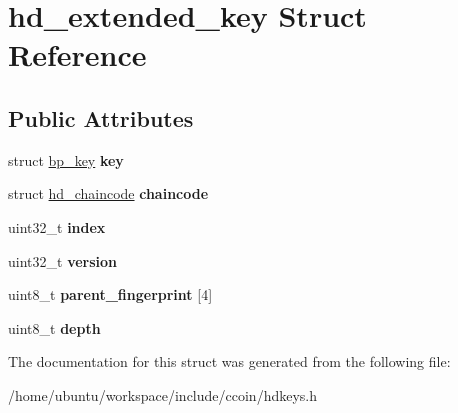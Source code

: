 \hypertarget{structhd__extended__key}{\section{hd\-\_\-extended\-\_\-key Struct Reference}
\label{structhd__extended__key}
}
\subsection*{Public Attributes}
\begin{DoxyCompactItemize}
\item 
\hypertarget{structhd__extended__key_a32e2a6e132a0af22cef89eca32424df1}{struct \hyperlink{structbp__key}{bp\-\_\-key} {\bfseries key}}\label{structhd__extended__key_a32e2a6e132a0af22cef89eca32424df1}

\item 
\hypertarget{structhd__extended__key_a859dec4ed38e20a43f828fbf1b79094e}{struct \hyperlink{structhd__chaincode}{hd\-\_\-chaincode} {\bfseries chaincode}}\label{structhd__extended__key_a859dec4ed38e20a43f828fbf1b79094e}

\item 
\hypertarget{structhd__extended__key_adfae22312bd519bd21f40aa1a2a9076b}{uint32\-\_\-t {\bfseries index}}\label{structhd__extended__key_adfae22312bd519bd21f40aa1a2a9076b}

\item 
\hypertarget{structhd__extended__key_a69c00a2d280a9cf3ea59d2b9799a7b6b}{uint32\-\_\-t {\bfseries version}}\label{structhd__extended__key_a69c00a2d280a9cf3ea59d2b9799a7b6b}

\item 
\hypertarget{structhd__extended__key_af703b27ec61d6b4285743279b09366af}{uint8\-\_\-t {\bfseries parent\-\_\-fingerprint} \mbox{[}4\mbox{]}}\label{structhd__extended__key_af703b27ec61d6b4285743279b09366af}

\item 
\hypertarget{structhd__extended__key_a77af7cd1b518b4717cb0ef60bff0471e}{uint8\-\_\-t {\bfseries depth}}\label{structhd__extended__key_a77af7cd1b518b4717cb0ef60bff0471e}

\end{DoxyCompactItemize}


The documentation for this struct was generated from the following file\-:\begin{DoxyCompactItemize}
\item 
/home/ubuntu/workspace/include/ccoin/hdkeys.\-h\end{DoxyCompactItemize}
